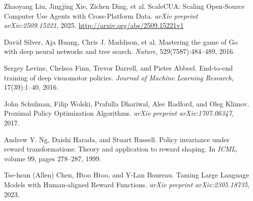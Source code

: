\documentclass{article}
\begin{document}
\begin{thebibliography}{9}

Zhaoyang Liu, Jingjing Xie, Zichen Ding, et al.
\newblock ScaleCUA: Scaling Open-Source Computer Use Agents with Cross-Platform Data.
\newblock \emph{arXiv preprint arXiv:2509.15221}, 2025.
\newblock \href{http://arxiv.org/abs/2509.15221v1}{http://arxiv.org/abs/2509.15221v1}

David Silver, Aja Huang, Chris J. Maddison, et al.
\newblock Mastering the game of Go with deep neural networks and tree search.
\newblock \emph{Nature}, 529(7587):484--489, 2016.

Sergey Levine, Chelsea Finn, Trevor Darrell, and Pieter Abbeel.
\newblock End-to-end training of deep visuomotor policies.
\newblock \emph{Journal of Machine Learning Research}, 17(39):1--40, 2016.

John Schulman, Filip Wolski, Prafulla Dhariwal, Alec Radford, and Oleg Klimov.
\newblock Proximal Policy Optimization Algorithms.
\newblock \emph{arXiv preprint arXiv:1707.06347}, 2017.

Andrew Y. Ng, Daishi Harada, and Stuart Russell.
\newblock Policy invariance under reward transformations: Theory and application to reward shaping.
\newblock In \emph{ICML}, volume 99, pages 278--287, 1999.

Tse-hsun (Allen) Chen, Htoo Htoo, and Y-Lan Boureau.
\newblock Taming Large Language Models with Human-aligned Reward Functions.
\newblock \emph{arXiv preprint arXiv:2305.18735}, 2023.

\end{thebibliography}
\end{document}
